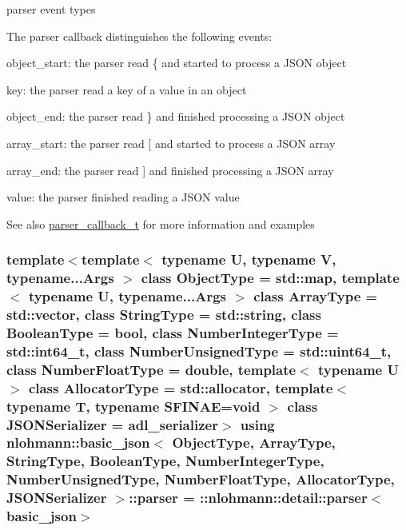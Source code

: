 parser event types 

The parser callback distinguishes the following events\+:
\begin{DoxyItemize}
\item {\ttfamily object\+\_\+start}\+: the parser read {\ttfamily \{} and started to process a J\+S\+ON object
\item {\ttfamily key}\+: the parser read a key of a value in an object
\item {\ttfamily object\+\_\+end}\+: the parser read {\ttfamily \}} and finished processing a J\+S\+ON object
\item {\ttfamily array\+\_\+start}\+: the parser read {\ttfamily \mbox{[}} and started to process a J\+S\+ON array
\item {\ttfamily array\+\_\+end}\+: the parser read {\ttfamily \mbox{]}} and finished processing a J\+S\+ON array
\item {\ttfamily value}\+: the parser finished reading a J\+S\+ON value
\end{DoxyItemize}

 \begin{DoxySeeAlso}{See also}
\hyperlink{classnlohmann_1_1basic__json_ab4f78c5f9fd25172eeec84482e03f5b7}{parser\+\_\+callback\+\_\+t} for more information and examples 
\end{DoxySeeAlso}
\subsubsection[{\texorpdfstring{parser}{parser}}]{\setlength{\rightskip}{0pt plus 5cm}template$<$template$<$ typename U, typename V, typename...\+Args $>$ class Object\+Type = std\+::map, template$<$ typename U, typename...\+Args $>$ class Array\+Type = std\+::vector, class String\+Type  = std\+::string, class Boolean\+Type  = bool, class Number\+Integer\+Type  = std\+::int64\+\_\+t, class Number\+Unsigned\+Type  = std\+::uint64\+\_\+t, class Number\+Float\+Type  = double, template$<$ typename U $>$ class Allocator\+Type = std\+::allocator, template$<$ typename T, typename S\+F\+I\+N\+A\+E=void $>$ class J\+S\+O\+N\+Serializer = adl\+\_\+serializer$>$ using {\bf nlohmann\+::basic\+\_\+json}$<$ Object\+Type, Array\+Type, String\+Type, Boolean\+Type, Number\+Integer\+Type, Number\+Unsigned\+Type, Number\+Float\+Type, Allocator\+Type, J\+S\+O\+N\+Serializer $>$\+::{\bf parser} =  \+::{\bf nlohmann\+::detail\+::parser}$<${\bf basic\+\_\+json}$>$\hspace{0.3cm}{\ttfamily [private]}}\hypertarget{classnlohmann_1_1basic__json_aba9704e82d18f8954f9925e26cec7a51}{}\label{classnlohmann_1_1basic__json_aba9704e82d18f8954f9925e26cec7a51}
